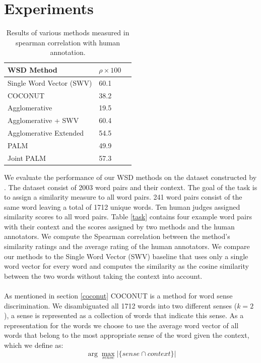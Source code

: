 \documentclass[11pt]{article}
\begin{document}
\section{Experiments}
\begin{table}
\center
    \begin{tabular}{|l|l|l|}
    \hline
    \textbf{WSD Method} & $\rho \times 100$ \\ \hline
    Single Word Vector (SWV) & 60.1 \\ \hline
    COCONUT & 38.2 \\ \hline
    Agglomerative & 19.5 \\ \hline
    Agglomerative + SWV & 60.4 \\ \hline
    Agglomerative Extended & 54.5 \\ \hline
    PALM & 49.9 \\ \hline
    Joint PALM & 57.3 \\ \hline
    \end{tabular}
    \caption{Results of various methods measured in spearman correlation with human annotation.}
    \label{results}
\end{table}
We evaluate the performance of our WSD methods on the dataset constructed by \cite{global}. The dataset consist of 2003 word pairs and their context. The goal of the task is to assign a similarity measure to all word pairs. 241 word pairs consist of the same word leaving a total of 1712 unique words. Ten human judges assigned similarity scores to all word pairs. Table \ref{task} contains four example word pairs with their context and the scores assigned by two methods and the human annotators. We compute the Spearman correlation between the method's similarity ratings and the average rating of the human annotators. We compare our methods to the Single Word Vector (SWV) baseline that uses only a single word vector for every word and computes the similarity as the cosine similarity between the two words without taking the context into account. \\\\
As mentioned in section \ref{coconut} COCONUT is a method for word sense discrimination. We disambiguated all 1712 words into two different senses ($k = 2$), a sense is represented as a collection of words that indicate this sense. As a representation for the words we choose to use the average word vector of all words that belong to the most appropriate sense of the word given the context, which we define as:
\begin{equation}\label{sense} \arg\max_{\textit{sense}}  | \{\textit{sense} \cap \textit{context}\} |\end{equation}
\end{document}
